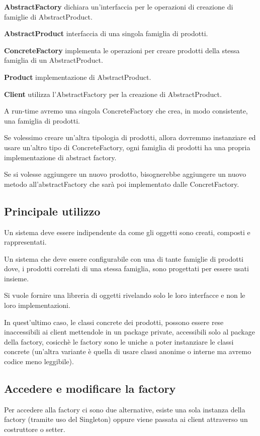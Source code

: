 \textbf{AbstractFactory} dichiara un’interfaccia per le operazioni di creazione di famiglie di AbstractProduct.

\textbf{AbstractProduct} interfaccia di una singola famiglia di prodotti.

\textbf{ConcreteFactory} implementa le operazioni per creare prodotti della stessa famiglia di un AbstractProduct.

\textbf{Product} implementazione di AbstractProduct.

\textbf{Client} utilizza l'AbstractFactory per la creazione di AbstractProduct.

A run-time avremo una singola ConcreteFactory che crea, in modo consistente, una famiglia di prodotti.

Se volessimo creare un'altra tipologia di prodotti, allora dovremmo instanziare ed usare un'altro tipo di ConcreteFactory, ogni famiglia di prodotti ha una propria 
implementazione di abstract factory.

Se si volesse aggiungere un nuovo prodotto, bisognerebbe aggiungere un nuovo metodo all'abstractFactory che sarà poi implementato dalle ConcretFactory.

\subsection{Principale utilizzo}

Un sistema deve essere indipendente da come gli oggetti sono creati, composti e rappresentati.

Un sistema che deve essere configurabile con una di tante famiglie di prodotti dove, i prodotti correlati di una stessa famiglia, sono progettati per essere usati 
insieme.

Si vuole fornire una libreria di oggetti rivelando solo le loro interfacce e non le loro implementazioni.

In quest'ultimo caso, le classi concrete dei prodotti, possono essere rese inaccessibili ai client mettendole in un package private, accessibili solo al package della
factory, cosicchè le factory sono le uniche a poter instanziare le classi concrete (un'altra variante è quella di usare classi anonime o interne ma avremo codice meno
leggibile).

\subsection{Accedere e modificare la factory}

Per accedere alla factory ci sono due alternative, esiste una sola instanza della factory (tramite uso del Singleton) oppure viene passata ai client attraverso un 
costruttore o setter.

